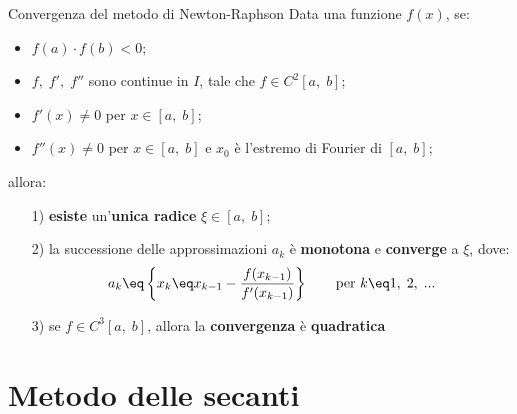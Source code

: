 \begin{theorem}{Convergenza del metodo di Newton-Raphson}
    Data una funzione $f(x)$, se:
    \begin{itemize}
        \item $f(a) \cdot f(b) < 0$;
        \item $f, \; f', \; f''$ sono continue in $I$, tale che $f \in C^2 [a, \; b]$;
        \item $f'(x) \neq 0$ per $x \in [a, \; b]$;
        \item $f''(x) \neq 0$ per $x \in [a, \; b]$ e $x_0$ è l'estremo di Fourier di $[a, \; b]$;
    \end{itemize}

    allora:
    \begin{itemize}
        \item [1)] \textbf{esiste} un'\textbf{unica radice} $\xi \in [a, \; b]$;
        \item [2)] la successione delle approssimazioni $a_k$ è \textbf{monotona} e \textbf{converge} a $\xi$, dove:
        \[ a_k \eq \left\{ x_k \eq x_{k - 1} - \frac{f(x_{k - 1})}{f'(x_{k - 1})} \right\} \quad\quad \text{per } k \eq 1, \; 2, \; ... \]
        \item [3)] se $f \in C^3 [a, \; b]$, allora la \textbf{convergenza} è \textbf{quadratica}
    \end{itemize}

    \begin{center}
    \end{center}
\end{theorem}

\section{Metodo delle secanti}

